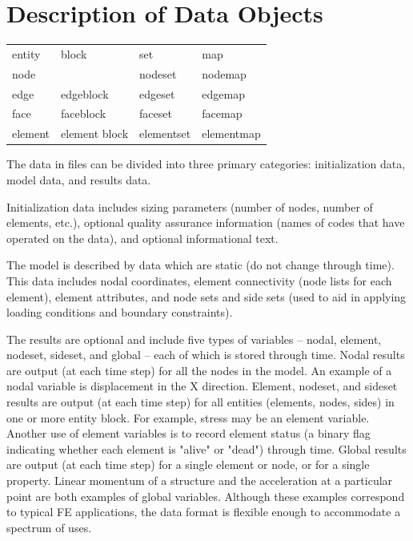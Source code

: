 \chapter{Description of Data Objects} 

\begin{tabular}{llll}
entity  & block         & set        & map    \\
node    &               & nodeset    & nodemap \\
edge    & edgeblock     & edgeset    & edgemap  \\
face    & faceblock     & faceset    & facemap   \\
element & element block & elementset & elementmap \\
\end{tabular}

The data in \exo{} files can be divided into three primary categories:
initialization data, model data, and results data.

Initialization data includes sizing parameters (number of 
nodes, number of elements, etc.), optional quality assurance 
information (names of codes that have operated on the data), 
and optional informational text.

The model is described by data which are static (do not change 
through time). This data includes nodal coordinates, element 
connectivity (node lists for each element), element attributes, 
and node sets and side sets (used to aid in applying loading 
conditions and boundary constraints). 

The results are optional and include five types of variables -- nodal,
element, nodeset, sideset, and global -- each of which is stored
through time. Nodal results are output (at each time step) for all the
nodes in the model. An example of a nodal variable is displacement in
the X direction. Element, nodeset, and sideset results are output (at
each time step) for all entities (elements, nodes, sides) in one or
more entity block. For example, stress may be an element
variable. Another use of element variables is to record element status
(a binary flag indicating whether each element is "alive" or "dead")
through time. Global results are output (at each time step) for a
single element or node, or for a single property. Linear momentum of a
structure and the acceleration at a particular point are both examples
of global variables. Although these examples correspond to typical FE
applications, the data format is flexible enough to accommodate a
spectrum of uses.

